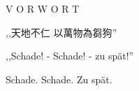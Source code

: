 \documentclass[12pt]{article}
\begin{document}
\begingroup
\begin{center}
\end{center}
\endgroup

\vspace{13\baselineskip}

\begingroup
\begin{center}
\huge V O R W O R T
\end{center}
\endgroup

\vspace{6\baselineskip}

\begingroup
\begin{center}
{\setmainfont{Source Han Serif SC}\selectfont ,,天地不仁 以萬物為芻狗'' }
\end{center}
\endgroup

\begingroup
\begin{center}
,,Schade! - Schade! - zu spät!'' 
\end{center}
\endgroup

\begingroup
\begin{center}
Schade. Schade. Zu spät.
\end{center}
\endgroup
\end{document}
